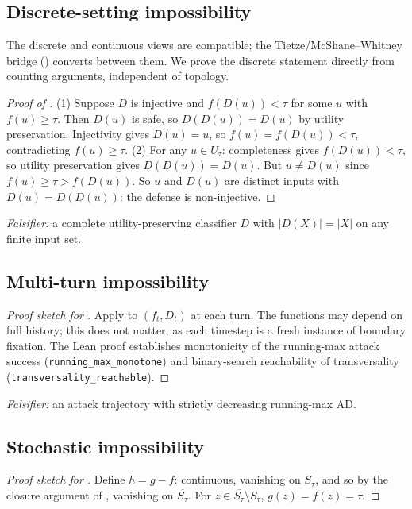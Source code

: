 \documentclass[11pt]{article}
\newcommand{\cl}[1]{\overline{#1}}
\begin{document}
\subsection{Discrete-setting impossibility}

The discrete and continuous views are compatible; the
Tietze/McShane--Whitney bridge () converts between
them. We prove the discrete statement directly from counting
arguments, independent of topology.
\begin{proof}[Proof of ]
(1) Suppose $D$ is injective and $f(D(u)) < \tau$ for some $u$ with
$f(u) \geq \tau$. Then $D(u)$ is safe, so $D(D(u)) = D(u)$ by utility
preservation. Injectivity gives $D(u) = u$, so $f(u) = f(D(u)) < \tau$,
contradicting $f(u) \geq \tau$.
(2) For any $u \in U_\tau$: completeness gives $f(D(u)) < \tau$, so
utility preservation gives $D(D(u)) = D(u)$. But $u \neq D(u)$ since
$f(u) \geq \tau > f(D(u))$. So $u$ and $D(u)$ are distinct inputs with
$D(u) = D(D(u))$: the defense is non-injective.
\end{proof}

\emph{Falsifier:} a complete utility-preserving classifier $D$ with
$|D(X)| = |X|$ on any finite input set.

\subsection{Multi-turn impossibility}
\begin{proof}[Proof sketch for ]
Apply  to $(f_t, D_t)$ at each turn. The functions may
depend on full history; this does not matter, as each timestep is a
fresh instance of boundary fixation. The Lean proof establishes
monotonicity of the running-max attack success
(\texttt{running\_max\_monotone}) and binary-search reachability of
transversality (\texttt{transversality\_reachable}).
\end{proof}

\emph{Falsifier:} an attack trajectory with strictly decreasing
running-max AD.

\subsection{Stochastic impossibility}
\begin{proof}[Proof sketch for ]
Define $h = g - f$: continuous, vanishing on $S_\tau$, and so by the
closure argument of , vanishing on
$\cl{S_\tau}$. For $z \in \cl{S_\tau} \setminus S_\tau$,
$g(z) = f(z) = \tau$.
\end{proof}
\end{document}
